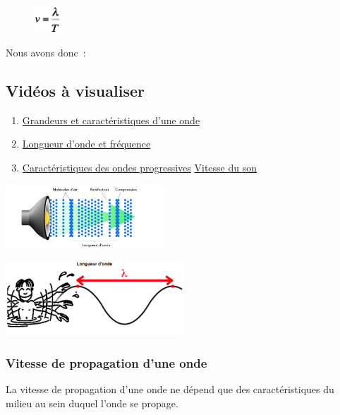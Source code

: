 \begin{multicols}{2}
\begin{figure}
\centering
\includegraphics[width=1.011cm,height=1.011cm]{Pictures/100000010000002500000025CFFC3028DD656A44.png}
\caption{}
\end{figure}

Nous avons donc~:

\subsection{Vidéos à visualiser}

\begin{enumerate}
 \item \href{https://youtu.be/4dnzEEHRTEI}{Grandeurs et caractéristiques d'une
onde}
 \item \href{https://youtu.be/2ww9MBD9UC0}{Longueur d'onde et fréquence}
 \item  \href{https://youtu.be/C5woKhTTKCM}{Caractéristiques des ondes progressives}
\href{https://youtu.be/pkv9OIHOmSU}{Vitesse du son}
\end{enumerate}

\includegraphics[width=5.913cm,height=2.417cm]{Pictures/100000010000030600000136256A22B2EA4BE45D.png}

\includegraphics[width=6.668cm,height=2.748cm]{Pictures/100000010000028B0000010CEC2C8A290864C23E.png}

\subsubsection{Vitesse de propagation d'une onde }

La vitesse de propagation d'une onde ne dépend que des caractéristiques du milieu
au sein duquel l'onde se propage. 


\end{multicols}
